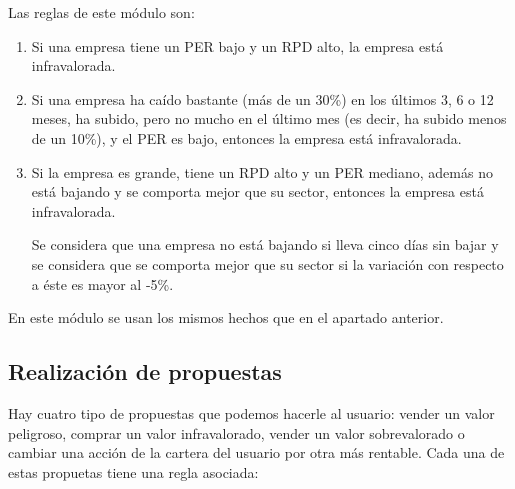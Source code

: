 \documentclass[11pt,openany]{book} %
\begin{document}
Las reglas de este módulo son:

\begin{enumerate}[\qquad\color{ocre}{$\bullet$}]
    \item Si una empresa tiene un PER bajo y un RPD alto, la empresa está infravalorada.

    \item Si una empresa ha caído bastante (más de un 30\%) en los últimos 3, 6 o 12 meses, ha subido, pero no mucho en el último mes (es decir, ha subido menos de un 10\%), y el PER es bajo, entonces la empresa está infravalorada.

    \item Si la empresa es grande, tiene un RPD alto y un PER mediano, además no está bajando y se comporta mejor que su sector, entonces la empresa está infravalorada. 

    Se considera que una empresa no está bajando si lleva cinco días sin bajar y se considera que se comporta mejor que su sector si la variación con respecto a éste es mayor al -5\%.
\end{enumerate}

En este módulo se usan los mismos hechos que en el apartado anterior.

\subsection{Realización de propuestas}

Hay cuatro tipo de propuestas que podemos hacerle al usuario: vender un valor peligroso, comprar un valor infravalorado, vender un valor sobrevalorado o cambiar  una acción de la cartera del usuario por otra más rentable. Cada una de estas propuetas tiene una regla asociada:
\end{document}
